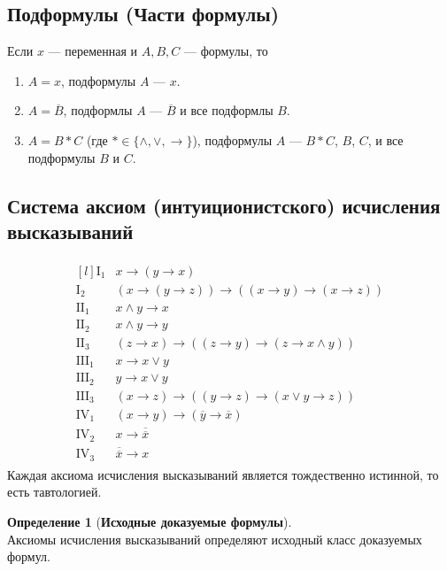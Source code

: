 \documentclass[fleqn,11pt]{article}
\newcommand{\NOT}[1]{\overline{#1}}
\newcommand{\DNOT}[1]{\overline{\overline{#1}}}
\theoremstyle{definition}
\newtheorem{definition}{Определение}
\newenvironment{tightenum}{
\begin{enumerate}
  \setlength{\itemsep}{1pt}
  \setlength{\parskip}{0pt}
  \setlength{\parsep}{0pt}}{\end{enumerate}
}
\begin{document}
\subsection{Подформулы (Части формулы)}
Если $x$ \cdash--- переменная и $A, B, C$ \cdash--- формулы, то
\begin{tightenum}
	\item $A = x$, подформулы $A$ \cdash--- $x$.
	\item $A = \NOT{B}$, подформлы $A$ \cdash--- $\NOT{B}$ и все подформлы $B$.
	\item $A = B \ast C$ (где $\ast \in \{\land, \lor, \rightarrow\}$),  подформулы $A$ \cdash--- $B \ast C$, $B$, $C$,
	и все подформулы $B$ и $C$.
\end{tightenum}


\subsection{Система аксиом (интуиционистского) исчисления высказываний }
\begin{align}
	\begin{matrix*}[l]
		\text{I}_1 & x \rightarrow (y \rightarrow x) \\
		\text{I}_2 & (x \rightarrow (y \rightarrow z)) \rightarrow ((x \rightarrow y) \rightarrow (x \rightarrow z)) \\
		\text{II}_1 & x \land y \rightarrow x \\
		\text{II}_2 & x \land y \rightarrow y \\
		\text{II}_3 & (z \rightarrow x) \rightarrow ((z \rightarrow y) \rightarrow (z \rightarrow x \land y))\\
		\text{III}_1 & x \rightarrow x \lor y \\
		\text{III}_2 & y \rightarrow x \lor y \\
		\text{III}_3 & (x \rightarrow z) \rightarrow ((y \rightarrow z) \rightarrow (x \lor y \rightarrow z)) \\
		\text{IV}_1 & (x \rightarrow y ) \rightarrow (\NOT{y} \rightarrow \NOT{x}) \\
		\text{IV}_2 & x \rightarrow \DNOT{x}\\
		\text{IV}_3 & \DNOT{x} \rightarrow x
	\end{matrix*}
\end{align}
Каждая аксиома исчисления высказываний является тождественно истинной, то есть тавтологией.

\begin{definition}[\textbf{Исходные доказуемые формулы}] ~\\
	Аксиомы исчисления высказываний определяют исходный класс доказуемых формул.
\end{definition}
\end{document}
